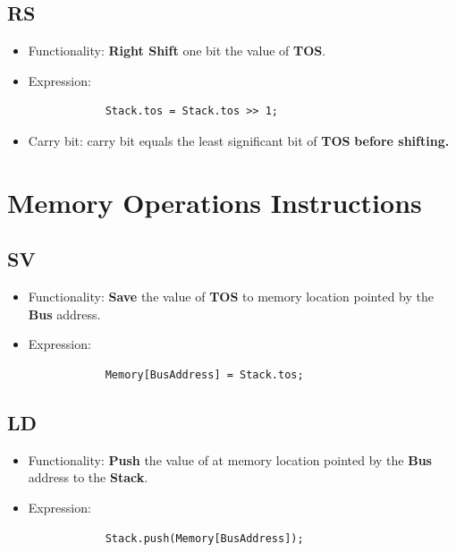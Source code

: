 \documentclass[11pt]{report}
\begin{document}
    \subsection{RS}
    \label{subsection:rs}
    \begin{itemize}
        \item Functionality: \textbf{Right Shift} one bit the value of \textbf{TOS}.
        \item Expression:
        \begin{verbatim}
            Stack.tos = Stack.tos >> 1;
        \end{verbatim}
        \item Carry bit: carry bit equals the least significant bit of \textbf{TOS} \textbf{before shifting.} 
    \end{itemize}

    \section{Memory Operations Instructions}
    \subsection{SV}
    \begin{itemize}
        \item Functionality: \textbf{Save} the value of \textbf{TOS} to memory location 
                pointed by the \textbf{Bus} address.
        \item Expression:
        \begin{verbatim}
            Memory[BusAddress] = Stack.tos;
        \end{verbatim}
    \end{itemize}

    \subsection{LD}
    \begin{itemize}
        \item Functionality: \textbf{Push} the value of at memory location 
                pointed by the \textbf{Bus} address to the \textbf{Stack}.
        \item Expression:
        \begin{verbatim}
            Stack.push(Memory[BusAddress]);
        \end{verbatim}
    \end{itemize}
\end{document}
